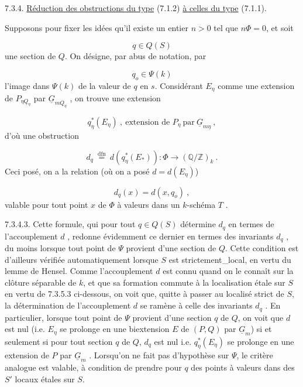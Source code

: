 

7.3.4.  \underline{Réduction des obstructions du type} (7.1.2) \underline{à celles du type} (7.1.1).

Supposons pour fixer les idées qu'il existe un entier $n > 0$ tel que $n \Phi = 0$, et soit

\begin{equation*}
q \in Q(S)
\end{equation*}
une section de $Q$. On désigne, par abus de notation, par

\begin{equation*}
q_o \in \Psi(k)
\end{equation*}
l'image dans $\Psi(k)$ de la valeur de $q$ en $s$. Considérant $E_\eta$ comme une extension de $P_{\eta Q_\eta}$ par $\underline{G}_{mQ_\eta}$ , on trouve une extension

\begin{equation*}
q^*_\eta(E_\eta) \ , \ \text{extension de } P_\eta \ \text{par} \ \underline{G}_{m\eta} \ ,
\end{equation*}
d'où une obstruction

\begin{equation}\tag{7.3.4.1}
d_q \ \overset{\mathrm{dfn}}{=} \ d(q^*_\eta(E_*)) : \Phi \longrightarrow (\mathbb{Q}/\mathbb{Z})_k \ .
\end{equation}
Ceci posé, on a la relation (où on a posé $d = d(E_\eta)$)

\begin{equation}\tag{7.3.4.2}
d_q(x) = d(x,q_o) \ ,
\end{equation}
valable pour tout point $x$ de $\Phi$ à valeurs dans un $k$-schéma $T$ .

7.3.4.3.  Cette formule, qui pour tout $q \in Q(S)$ détermine $d_q$ en termes de l'accouplement $d$ , redonne évidemment ce dernier en termes des invariants $d_q$ , du moins lorsque tout point de $\Psi$ provient d'une section de $Q$. Cette condition est d'ailleurs vérifiée automatiquement lorsque $S$ est strictement\_local, en vertu du lemme de Hensel. Comme l'accouplement $d$ est connu quand on le connaît sur la clôture séparable de $k$, et que sa formation commute à la localisation étale sur $S$ en vertu de 7.3.5.3
ci-dessous, on voit que, quitte à passer au localisé strict de $S$, la détermination de l'accouplement $d$ se ramène à celle des invariants $d_q$ . En particulier, lorsque tout point de $\Psi$ provient d'une section $q$ de $Q$, on voit que $d$ est nul (i.e. $E_\eta$ se prolonge en une biextension $E$ de $(P,Q)$ par $\underline{G}_m$) si et seulement si pour tout section $q$ de $Q$, $d_q$ est nul i.e. $q^*_\eta(E_\eta)$ se prolonge en une extension de $P$ par $\underline{G}_m$ . Lorsqu'on ne fait pas d'hypothèse sur $\Psi$, le critère analogue est valable, à condition de prendre pour $q$ des points à valeurs dans des $S'$ locaux étales sur $S$.

